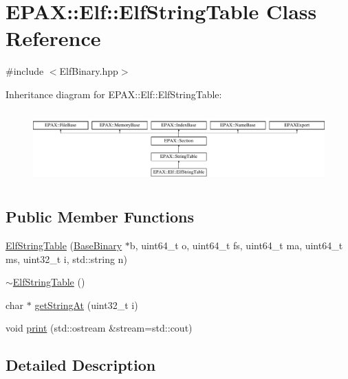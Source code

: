 \hypertarget{class_e_p_a_x_1_1_elf_1_1_elf_string_table}{\section{\-E\-P\-A\-X\-:\-:\-Elf\-:\-:\-Elf\-String\-Table \-Class \-Reference}
\label{class_e_p_a_x_1_1_elf_1_1_elf_string_table}
}


{\ttfamily \#include $<$\-Elf\-Binary.\-hpp$>$}

\-Inheritance diagram for \-E\-P\-A\-X\-:\-:\-Elf\-:\-:\-Elf\-String\-Table\-:\begin{figure}[H]
\begin{center}
\leavevmode
\includegraphics[height=2.800000cm]{class_e_p_a_x_1_1_elf_1_1_elf_string_table}
\end{center}
\end{figure}
\subsection*{\-Public \-Member \-Functions}
\begin{DoxyCompactItemize}
\item 
\hyperlink{class_e_p_a_x_1_1_elf_1_1_elf_string_table_a24ad50d1642c3c432e3623c0b633f59d}{\-Elf\-String\-Table} (\hyperlink{class_e_p_a_x_1_1_base_binary}{\-Base\-Binary} $\ast$b, uint64\-\_\-t o, uint64\-\_\-t fs, uint64\-\_\-t ma, uint64\-\_\-t ms, uint32\-\_\-t i, std\-::string n)
\item 
\hyperlink{class_e_p_a_x_1_1_elf_1_1_elf_string_table_a7eb7c7cf0000dbc952084bf544cef094}{$\sim$\-Elf\-String\-Table} ()
\item 
char $\ast$ \hyperlink{class_e_p_a_x_1_1_elf_1_1_elf_string_table_a5090981e577dceb27e8dd6c63f1992ba}{get\-String\-At} (uint32\-\_\-t i)
\item 
void \hyperlink{class_e_p_a_x_1_1_elf_1_1_elf_string_table_a025f9dab1825e838634d998481bfa1cf}{print} (std\-::ostream \&stream=std\-::cout)
\end{DoxyCompactItemize}


\subsection{\-Detailed \-Description}


